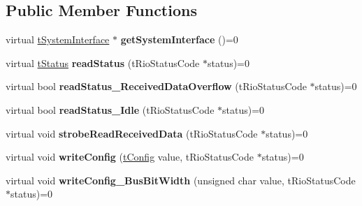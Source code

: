 \subsection*{Public Member Functions}
\begin{DoxyCompactItemize}
\item 
\hypertarget{classnFPGA_1_1nFRC__2012__1__6__4_1_1tSPI_a51199de8d623ff7748b047d9a5299aa9}{
virtual \hyperlink{classnFPGA_1_1tSystemInterface}{tSystemInterface} $\ast$ {\bfseries getSystemInterface} ()=0}
\label{classnFPGA_1_1nFRC__2012__1__6__4_1_1tSPI_a51199de8d623ff7748b047d9a5299aa9}

\item 
\hypertarget{classnFPGA_1_1nFRC__2012__1__6__4_1_1tSPI_acaf1a2c8e87e8b6b2ced068460437c9b}{
virtual \hyperlink{unionnFPGA_1_1nFRC__2012__1__6__4_1_1tSPI_1_1tStatus}{tStatus} {\bfseries readStatus} (tRioStatusCode $\ast$status)=0}
\label{classnFPGA_1_1nFRC__2012__1__6__4_1_1tSPI_acaf1a2c8e87e8b6b2ced068460437c9b}

\item 
\hypertarget{classnFPGA_1_1nFRC__2012__1__6__4_1_1tSPI_abd39e6c9d7ac1aa7e2a12f5b26fa793a}{
virtual bool {\bfseries readStatus\_\-ReceivedDataOverflow} (tRioStatusCode $\ast$status)=0}
\label{classnFPGA_1_1nFRC__2012__1__6__4_1_1tSPI_abd39e6c9d7ac1aa7e2a12f5b26fa793a}

\item 
\hypertarget{classnFPGA_1_1nFRC__2012__1__6__4_1_1tSPI_afcb0a741056d5644d88b9f88df8a850a}{
virtual bool {\bfseries readStatus\_\-Idle} (tRioStatusCode $\ast$status)=0}
\label{classnFPGA_1_1nFRC__2012__1__6__4_1_1tSPI_afcb0a741056d5644d88b9f88df8a850a}

\item 
\hypertarget{classnFPGA_1_1nFRC__2012__1__6__4_1_1tSPI_ae41a928d32f85ee50963909b6f92883c}{
virtual void {\bfseries strobeReadReceivedData} (tRioStatusCode $\ast$status)=0}
\label{classnFPGA_1_1nFRC__2012__1__6__4_1_1tSPI_ae41a928d32f85ee50963909b6f92883c}

\item 
\hypertarget{classnFPGA_1_1nFRC__2012__1__6__4_1_1tSPI_ac054ee7004fa7844dc70ddc77057f55f}{
virtual void {\bfseries writeConfig} (\hyperlink{unionnFPGA_1_1nFRC__2012__1__6__4_1_1tSPI_1_1tConfig}{tConfig} value, tRioStatusCode $\ast$status)=0}
\label{classnFPGA_1_1nFRC__2012__1__6__4_1_1tSPI_ac054ee7004fa7844dc70ddc77057f55f}

\item 
\hypertarget{classnFPGA_1_1nFRC__2012__1__6__4_1_1tSPI_ac1223ff9af4be6ebd7d8efdbbb00262f}{
virtual void {\bfseries writeConfig\_\-BusBitWidth} (unsigned char value, tRioStatusCode $\ast$status)=0}
\label{classnFPGA_1_1nFRC__2012__1__6__4_1_1tSPI_ac1223ff9af4be6ebd7d8efdbbb00262f}


\end{DoxyCompactItemize}
